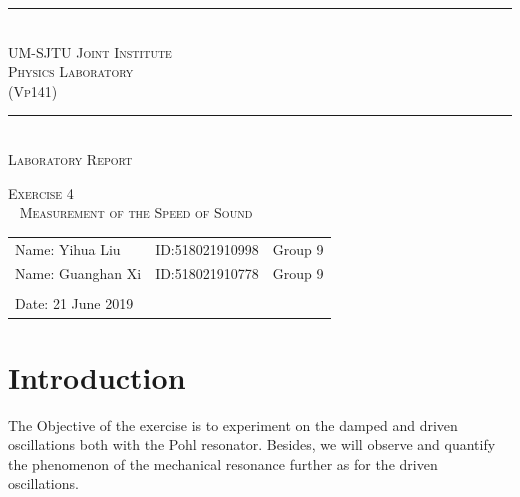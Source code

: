 \documentclass[a4paper]{report}
\begin{document}
	\renewcommand\thesection{\arabic{section}}
	\begin{Large}
		\begin{center}
			\setlength{\baselineskip}{14pt}
			\vspace{1.25cm}
			\rule[0cm]{11.2cm}{0.03em}\\
			\vspace{0.5cm}
			\textsc{UM-SJTU Joint Institute}\\
			\vspace{0.25cm}
			\textsc{Physics Laboratory\\(Vp141)}
			\vspace{0.3cm}
			\rule[0cm]{11.8cm}{0.05em}
			\vspace{4.9cm}\\
			\textsc{Laboratory Report}
		\end{center}
	\end{Large}
	\vspace{0.85cm}
	\begin{large}
		\begin{center}
			\textsc{Exercise 4}
			\\~
			\textsc{Measurement of the Speed of Sound}
		\end{center}
		\vspace{6cm}
	\end{large}
	\begin{tabular}{l l l}
	Name: Yihua Liu&ID:518021910998&Group 9\\
	Name: Guanghan Xi&ID:518021910778&Group 9\\
	&&\\
	Date: 21 June 2019&&\\
	\end{tabular}
	\thispagestyle{empty}
	\newpage
	\section{Introduction}
	The Objective of the exercise is to experiment on the damped and driven oscillations both with the Pohl resonator. Besides, we will observe and quantify the phenomenon of the mechanical resonance further as for the driven oscillations.
	
\end{document}
